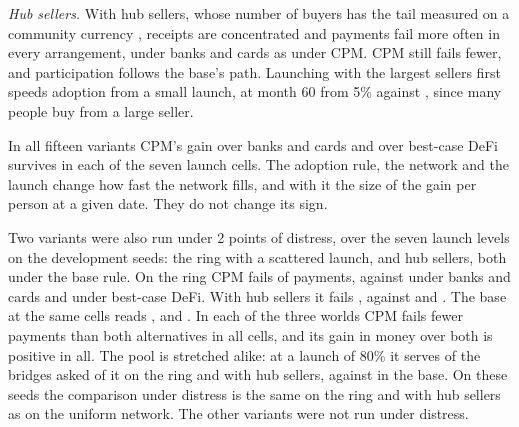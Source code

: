 \emph{Hub sellers.} With hub sellers, whose number of buyers has the tail measured on a community currency
\cite{mattsson,goh}, receipts are concentrated and payments fail more often in every arrangement, under banks and
cards as under CPM. CPM still fails fewer, and participation follows the base's path. Launching with the largest
sellers first speeds adoption from a small launch, \RobustHubsLargestPartFive{} at month 60 from 5\% against
\RobustHubsPartFive{}, since many people buy from a large seller.

In all fifteen variants CPM's gain over banks and cards and over best-case DeFi survives in each of the seven
launch cells. The adoption rule, the network and the launch change how fast the network fills, and with it the size
of the gain per person at a given date. They do not change its sign.

Two variants were also run under 2 points of distress, over the seven launch levels on the development
seeds: the ring with a scattered launch, and hub sellers, both under the base rule. On the ring CPM fails
\RobustStressRingFailCpm{} of payments, against \RobustStressRingFailBanks{} under banks and cards and
\RobustStressRingFailDefi{} under best-case DeFi. With hub sellers it fails \RobustStressHubsFailCpm{}, against
\RobustStressHubsFailBanks{} and \RobustStressHubsFailDefi{}. The base at the same cells reads
\RobustStressBaseFailCpm{}, \RobustStressBaseFailBanks{} and \RobustStressBaseFailDefi{}. In each of the three
worlds CPM fails fewer payments than both alternatives in all \RobustStressRingCells{} cells, and its gain in money
over both is positive in all. The pool is stretched alike: at a launch of 80\% it serves
\RobustStressRingServedHigh{} of the bridges asked of it on the ring and \RobustStressHubsServedHigh{} with hub
sellers, against \RobustStressBaseServedHigh{} in the base. On these seeds the comparison under distress is the
same on the ring and with hub sellers as on the uniform network. The other variants were not run under distress.

\begin{table}[htbp]\centering\small
\resizebox{\linewidth}{!}{}
\caption{The adoption rule, the sellers' network and the launch placement, each replaced in turn: seven launch
levels at an outside rate of 4.4\% with no distress, development seeds. Participation is the seed mean at month 60.
Gains are CPM's, in money, in dollars a person a year: the median over the seven cells and their range. A gain
survives in a cell when it is positive on the seed mean and in at least two of three seeds.}
\label{tab:robust}
\end{table}

